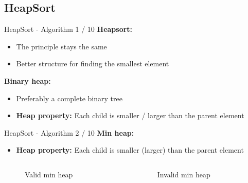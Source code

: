\subsection{HeapSort}

\begin{frame}{HeapSort - Algorithm 1 / 10}
  \textbf{Heapsort:}
  \begin{itemize}
    \item
      The principle stays the same
    \item
      Better structure for finding the smallest element
  \end{itemize}
  \textbf{Binary heap:}
  \begin{itemize}
    \item
      Preferably a complete binary tree
    \item
      \textbf{Heap property:} Each child is smaller / larger than the parent
      element
  \end{itemize}
\end{frame}


\begin{frame}{HeapSort - Algorithm 2 / 10}
  \textbf{Min heap:}
  \begin{itemize}
    \item
      \textbf{Heap property:} Each child is {\color{Mittel-Blau}smaller}
      (larger) than the parent element
  \end{itemize}
  \begin{columns}
    \begin{column}{0.45\textwidth}
      \begin{figure}[!h]
        \begin{adjustbox}{width=\linewidth}
          
        \end{adjustbox}
        \caption{Valid min heap}
        \label{fig:minheap_valid}
      \end{figure}
    \end{column}%
    \hspace*{0.1em}%
    \begin{column}{0.45\textwidth}
      \begin{figure}[!h]
        \begin{adjustbox}{width=\linewidth}
          
        \end{adjustbox}
        \caption{Invalid min heap}
        \label{fig:minheap_invalid}
      \end{figure}
    \end{column}
  \end{columns}
\end{frame}

